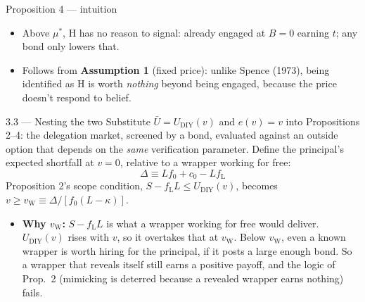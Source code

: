 \documentclass[11pt,aspectratio=169]{beamer}
\newcommand{\Ht}{\mathrm{H}}
\newcommand{\fL}{f_{\mathrm{L}}}
\newcommand{\Ubar}{\bar U}
\newcommand{\vW}{v_{\mathrm{W}}}
\newcommand{\UDIY}{U_{\mathrm{DIY}}}
\begin{document}
\begin{frame}{Proposition 4 --- intuition}
\begin{itemize}
  \item Above $\mu^*$, $\Ht$ has no reason to signal: already engaged at $B=0$ earning $t$; any bond only lowers that.
  \item Follows from \textbf{Assumption 1} (fixed price): unlike Spence (1973), being identified as $\Ht$ is worth \emph{nothing} beyond being engaged, because the price doesn't respond to belief.
\end{itemize}
\end{frame}

\begin{frame}{3.3 --- Nesting the two}
\small
Substitute $\Ubar=\UDIY(v)$ and $e(v)=v$ into Propositions 2--4: the delegation market, screened by a bond, evaluated against an outside option that depends on the \emph{same} verification parameter.
\vfill
Define the principal's expected shortfall at $v=0$, relative to a wrapper working for free:
\begin{equation*}
  \Delta \equiv Lf_0+c_0-L\fL
\end{equation*}
Proposition 2's scope condition, $S-\fL L\le\UDIY(v)$, becomes $v\ge\vW\equiv\Delta/[f_0(L-\kappa)]$.
\vfill
\begin{itemize}
  \item \textbf{Why $\vW$:} $S-\fL L$ is what a wrapper working for free would deliver. $\UDIY(v)$ rises with $v$, so it overtakes that at $\vW$. Below $\vW$, even a known wrapper is worth hiring for the principal, if it posts a large enough bond. So a wrapper that reveals itself still earns a positive payoff, and the logic of Prop.\ 2 (mimicking is deterred because a revealed wrapper earns nothing) fails.
\end{itemize}
\end{frame}
\end{document}
